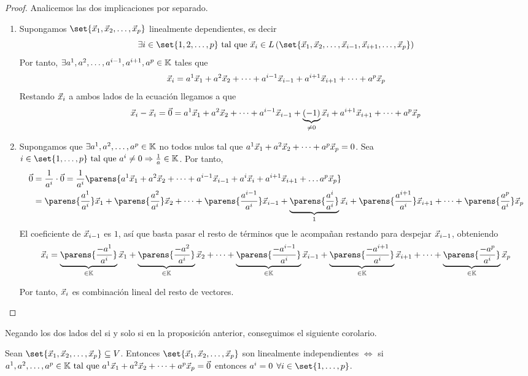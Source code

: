 \documentclass[../algebra_lineal.tex]{subfiles}
\begin{document}
\begin{proof}

    Analicemos las dos implicaciones por separado.
    \begin{enumerate}
        \item[\protect\fbox{$\Rightarrow$}] Supongamos $\set{\vlst{x}{p}}$ linealmente dependientes, es decir 
        \[\exists i \in \set{1, 2, \dots, p} \st \vx_i \in \lspan{\set{\vlst{x}{i-1}, \vx_{i+1}, \dots, \vx_p}}\]
        Por tanto, $\exists {a}^{1}, {a}^{2}, \dots, {a}^{i-1}, a^{i+1}, a^p \in \mathbb{K}$ tales que 
        \[
            \vec{x}_i = {a}^{1}\vec{x}_{1}+{a}^{2}\vec{x}_{2}+\dots+{a}^{i-1}\vec{x}_{i-1}+a^{i+1}\vec{x}_{i+1}+\dots+a^p \vec{x}_p  
        \]
        Restando $\vec{x}_i$ a ambos lados de la ecuación llegamos a que
        \[
            \vec{x}_i - \vec{x}_i = \vec{0}  = {a}^{1}\vec{x}_{1}+{a}^{2}\vec{x}_{2}+\dots+{a}^{i-1}\vec{x}_{i-1}+\underbrace{(-1)}_{\ne 0}\vec{x}_i +a^{i+1}\vec{x}_{i+1}+\dots+a^p \vec{x}_p
        \]
        \item[\protect\fbox{$\Leftarrow$}] Supongamos que $\exists {a}^{1}, {a}^{2}, \dots, {a}^{p} \in \mathbb{K}$ no todos nulos tal que ${a}^{1}\vec{x}_{1}+{a}^{2}\vec{x}_{2}+\dots+{a}^{p}\vec{x}_{p} = 0$. Sea $i\in \set{1, \dots, p} \st a^i \ne 0 \Rightarrow \frac{1}{a} \in \K$. Por tanto,
        \begin{align*}
            \zv &= \frac{1}{a^i} \cdot \zv = \frac{1}{a^i}\parens{ \lincomb{a}{x}{i-1} + a^i\vx_i + a^{i+1}\vx_{i+1} + \dots a^p\vx_p} \\
                &= \parens{\frac{a^1}{a^i}}\vx_1 + \parens{\frac{a^2}{a^i}}\vx_2 + \dots + \parens{\frac{a^{i-1}}{a^i}}\vx_{i-1} + \underbrace{\parens{\frac{a^{i}}{a^i}}}_{1}\vx_{i} + \parens{\frac{a^{i+1}}{a^i}}\vx_{i+1} + \dots + \parens{\frac{a^{p}}{a^i}}\vx_{p}
        \end{align*}
        El coeficiente de $\vec{x}_{i-1}$ es $1$, así que basta pasar el resto de términos que le acompañan restando para despejar $\vec{x}_{i-1}$, obteniendo 
        \[
           \vx_{i} = \underbrace{\parens{\frac{-a^1}{a^i}}}_{\in \K}\vx_1 + \underbrace{\parens{\frac{-a^2}{a^i}}}_{\in \K}\vx_2 + \dots + \underbrace{\parens{\frac{-a^{i-1}}{a^i}}}_{\in \K}\vx_{i-1} + \underbrace{\parens{\frac{-a^{i+1}}{a^i}}}_{\in \K}\vx_{i+1} + \dots + \underbrace{\parens{\frac{-a^{p}}{a^i}}}_{\in \K}\vx_{p}
        \]

        Por tanto, $\vec{x}_i$ es combinación lineal del resto de vectores.
    \end{enumerate}
\end{proof}

Negando los dos lados del si y solo si en la proposición anterior, conseguimos el siguiente corolario.

\begin{corollary}
    \label{linear_independence_corollary}
    Sean $\set{\vlst{x}{p}} \subseteq V$. Entonces $\set{\vlst{x}{p}}$ son linealmente independientes $\iff$ si  ${a}^{1}, {a}^{2}, \dots, {a}^{p} \in \mathbb{K} \mathrm{\,\, tal \,\, que \,\,} {a}^{1}\vec{x}_{1}+{a}^{2}\vec{x}_{2}+\dots+{a}^{p}\vec{x}_{p} = \vec{0}$ entonces $a^i = 0 \spc \forall i \in  \set{1, \dots, p} $. 
\end{corollary}
\end{document}
